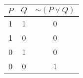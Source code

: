 \begin{tabular}{|c|c||c|}
\hline
$ P $ & $ Q $ & $  \sim (P \vee Q) $ \\
\hline
1 & 1 & 0 \\
1 & 0 & 0 \\
0 & 1 & 0 \\
0 & 0 & 1 \\
\hline
\end{tabular}
